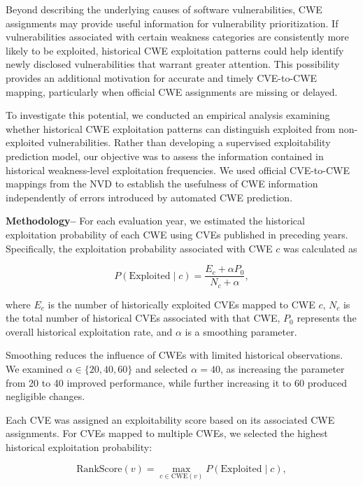 \documentclass[conference,compsoc]{IEEEtran}
\begin{document}
Beyond describing the underlying causes of software
vulnerabilities, CWE assignments may provide useful
information for vulnerability prioritization. If
vulnerabilities associated with certain weakness
categories are consistently more likely to be
exploited, historical CWE exploitation patterns
could help identify newly disclosed vulnerabilities
that warrant greater attention. This possibility
provides an additional motivation for accurate
and timely CVE-to-CWE mapping, particularly when
official CWE assignments are missing or delayed.

To investigate this potential, we conducted an
empirical analysis examining whether historical
CWE exploitation patterns can distinguish exploited
from non-exploited vulnerabilities. Rather than
developing a supervised exploitability prediction
model, our objective was to assess the information
contained in historical weakness-level exploitation
frequencies. We used official CVE-to-CWE mappings
from the NVD
to establish the usefulness of CWE information
independently of errors introduced by automated
CWE prediction.

\textbf{Methodology--}
For each evaluation year, we estimated the
historical exploitation probability of each
CWE using CVEs published in preceding years.
Specifically, the exploitation probability
associated with CWE $c$ was calculated as

\begin{equation}
P(\mathrm{Exploited}\mid c)=
\frac{E_c+\alpha P_0}{N_c+\alpha},
\label{eq:historical_exploitability}
\end{equation}

where $E_c$ is the number of historically
exploited CVEs mapped to CWE $c$, $N_c$ is
the total number of historical CVEs associated
with that CWE, $P_0$ represents the overall
historical exploitation rate, and $\alpha$
is a smoothing parameter.

Smoothing reduces the influence of CWEs with
limited historical observations. We examined
$\alpha \in \{20,40,60\}$ and selected
$\alpha=40$, as increasing the parameter
from 20 to 40 improved performance, while
further increasing it to 60 produced
negligible changes.

Each CVE was assigned an exploitability score
based on its associated CWE assignments.
For CVEs mapped to multiple CWEs, we selected
the highest historical exploitation probability:

\begin{equation}
\mathrm{RankScore}(v)=
\max_{c \in \mathrm{CWE}(v)}
P(\mathrm{Exploited}\mid c),
\label{eq:ranking_score}
\end{equation}
\end{document}
